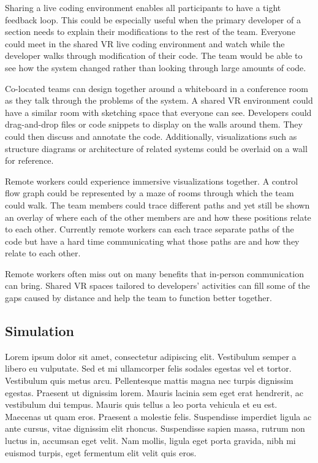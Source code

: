 \documentclass{acm_proc_article-sp}
\begin{document}
Sharing a live coding environment enables all participants to have a tight feedback loop. This could be especially useful when the primary developer of a section needs to explain their modifications to the rest of the team. Everyone could meet in the shared VR live coding environment and watch while the developer walks through modification of their code. The team would be able to see how the system changed rather than looking through large amounts of code.

Co-located teams can design together around a whiteboard in a conference room as they talk through the problems of the system. A shared VR environment could have a similar room with sketching space that everyone can see. Developers could drag-and-drop files or code snippets to display on the walls around them. They could then discuss and annotate the code. Additionally, visualizations such as structure diagrams or architecture of related systems could be overlaid on a wall for reference.

Remote workers could experience immersive visualizations together. A control flow graph could be represented by a maze of rooms through which the team could walk. The team members could trace different paths and yet still be shown an overlay of where each of the other members are and how these positions relate to each other. Currently remote workers can each trace separate paths of the code but have a hard time communicating what those paths are and how they relate to each other.

Remote workers often miss out on many benefits that in-person communication can bring. Shared VR spaces tailored to developers' activities can fill some of the gaps caused by distance and help the team to function better together. 

\subsection{Simulation}

Lorem ipsum dolor sit amet, consectetur adipiscing elit. Vestibulum semper a libero eu vulputate. Sed et mi ullamcorper felis sodales egestas vel et tortor. Vestibulum quis metus arcu. Pellentesque mattis magna nec turpis dignissim egestas. Praesent ut dignissim lorem. Mauris lacinia sem eget erat hendrerit, ac vestibulum dui tempus. Mauris quis tellus a leo porta vehicula et eu est. Maecenas ut quam eros. Praesent a molestie felis. Suspendisse imperdiet ligula ac ante cursus, vitae dignissim elit rhoncus. Suspendisse sapien massa, rutrum non luctus in, accumsan eget velit. Nam mollis, ligula eget porta gravida, nibh mi euismod turpis, eget fermentum elit velit quis eros.
\end{document}

